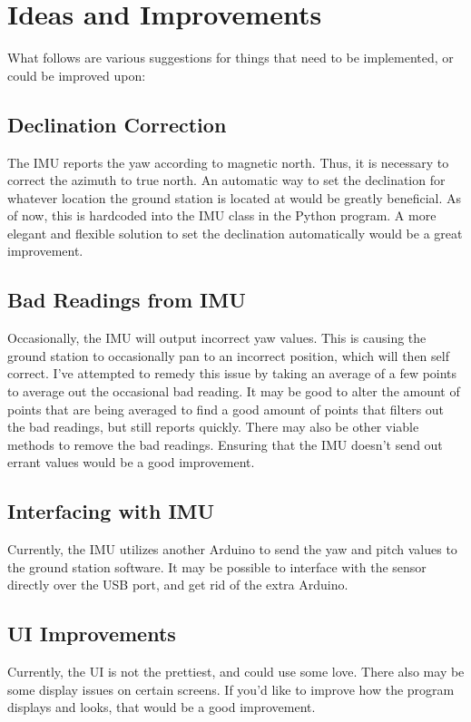 \documentclass{article}
\begin{document}
\section{Ideas and Improvements}
What follows are various suggestions for things that need to be implemented, or could be improved upon:

\subsection{Declination Correction}
The IMU reports the yaw according to magnetic north. Thus, it is necessary to correct the azimuth to true north. An automatic way to set the declination for whatever location the ground station is located at would be greatly beneficial. As of now, this is hardcoded into the IMU class in the Python program. A more elegant and flexible solution to set the declination automatically would be a great improvement.

\subsection{Bad Readings from IMU}
Occasionally, the IMU will output incorrect yaw values. This is causing the ground station to occasionally pan to an incorrect position, which will then self correct. I've attempted to remedy this issue by taking an average of a few points to average out the occasional bad reading. It may be good to alter the amount of points that are being averaged to find a good amount of points that filters out the bad readings, but still reports quickly. There may also be other viable methods to remove the bad readings. Ensuring that the IMU doesn't send out errant values would be a good improvement. 

\subsection{Interfacing with IMU}
Currently, the IMU utilizes another Arduino to send the yaw and pitch values to the ground station software. It may be possible to interface with the sensor directly over the USB port, and get rid of the extra Arduino. 

\subsection{UI Improvements}
Currently, the UI is not the prettiest, and could use some love. There also may be some  display issues on certain screens. If you'd like to improve how the program displays and looks, that would be a good improvement. 
\end{document}
